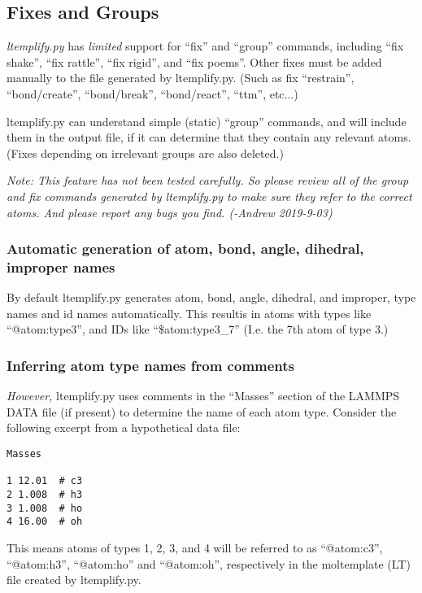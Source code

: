 \documentclass[11pt]{article}
\begin{document}
\subsection{Fixes and Groups}
\label{sec:ltemplify_fix_group}

\textit{ltemplify.py} has
\textit{limited} support for ``fix'' and ``group'' commands,
including ``fix shake'', ``fix rattle'', ``fix rigid'', and ``fix poems''.
Other fixes must be added manually to the file generated by ltemplify.py.
(Such as fix ``restrain'', ``bond/create'', ``bond/break'', ``bond/react'',
 ``ttm'', etc...)

ltemplify.py can understand simple (static) ``group'' commands, and will include them in the output file, if it can determine that they contain any relevant atoms.  (Fixes depending on irrelevant groups are also deleted.)

\textit{Note: This feature has not been tested carefully.  So please review all of the group and fix commands generated by ltemplify.py to make sure they refer to the correct atoms.  And please report any bugs you find. (-Andrew 2019-9-03)}



\subsubsection*{Automatic generation of atom, bond, angle, dihedral, improper names}

By default ltemplify.py generates atom, bond, angle, dihedral, and improper,
type names and id names automatically.
This resultis in atoms with types like ``@atom:type3'', and IDs like
``\$atom:type3\_7'' (I.e. the 7th atom of type 3.)

\subsubsection*{ Inferring atom type names from comments }

\textit{However,} ltemplify.py uses comments in the ``Masses'' section of
the LAMMPS DATA file (if present) to determine the name
of each atom type.
Consider the following excerpt from a hypothetical data file:
\begin{verbatim}
Masses

1 12.01  # c3
2 1.008  # h3
3 1.008  # ho
4 16.00  # oh
\end{verbatim}
This means atoms of types 1, 2, 3, and 4 will be referred to as
``@atom:c3'', ``@atom:h3'', ``@atom:ho'' and ``@atom:oh'',
respectively in the moltemplate (LT) file created by ltemplify.py.
\end{document}
